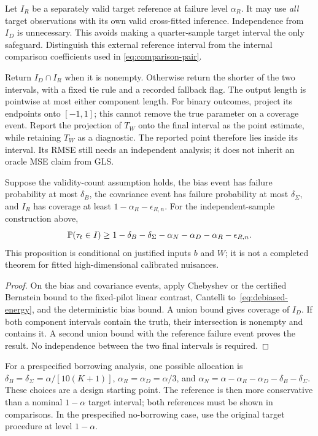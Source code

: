 Let $I_R$ be a separately valid target reference at failure level $\alpha_R$.
It may use \emph{all} target observations with its own valid cross-fitted
inference. Independence from $I_D$ is unnecessary. This avoids making a
quarter-sample target interval the only safeguard. Distinguish this external
reference interval from the internal comparison coefficients used in
\eqref{eq:comparison-pair}.

Return $I_D\cap I_R$ when it is nonempty. Otherwise return the shorter of the
two intervals, with a fixed tie rule and a recorded fallback flag. The output
length is pointwise at most either component length. For binary outcomes,
project its endpoints onto $[-1,1]$; this cannot remove the true parameter on
a coverage event. Report the projection of $T_W$ onto the final interval as
the point estimate, while retaining $T_W$ as a diagnostic. The reported point
therefore lies inside its interval. Its RMSE still needs an independent
analysis; it does not inherit an oracle MSE claim from GLS.

\begin{proposition}
Suppose the validity-count assumption holds, the bias event has failure
probability at most $\delta_B$, the covariance event has failure probability
at most $\delta_\Sigma$, and $I_R$ has coverage at least
$1-\alpha_R-\epsilon_{R,n}$. For the independent-sample construction above,
\[
 \mathbb P(\tau_t\in I)\ge
 1-\delta_B-\delta_\Sigma-\alpha_N-\alpha_D-\alpha_R-\epsilon_{R,n}.
\]
This proposition is conditional on justified inputs $b$ and $W$; it is not a
completed theorem for fitted high-dimensional calibrated nuisances.
\end{proposition}
\begin{proof}
On the bias and covariance events, apply Chebyshev or the certified Bernstein
bound to the fixed-pilot linear contrast, Cantelli to~\eqref{eq:debiased-energy},
and the deterministic bias
bound. A union bound gives coverage of $I_D$. If both component intervals
contain the truth, their intersection is nonempty and contains it. A second
union bound with the reference failure event proves the result. No independence
between the two final intervals is required.
\end{proof}

For a prespecified borrowing analysis, one possible allocation is
$\delta_B=\delta_\Sigma=\alpha/[10(K+1)]$,
$\alpha_R=\alpha_D=\alpha/3$, and
$\alpha_N=\alpha-\alpha_R-\alpha_D-\delta_B-\delta_\Sigma$.
These choices are a design starting point. The reference is then more
conservative than a nominal $1-\alpha$ target interval; both references must
be shown in comparisons. In the prespecified no-borrowing case, use the
original target procedure at level $1-\alpha$.

